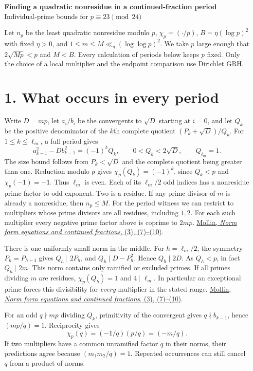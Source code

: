 \documentclass[11pt]{article}
\newcommand{\ch}{\chi_p}
\newcommand{\mollin}{\href{https://www.maths.tcd.ie/EMIS/journals/AMUC/_vol-74/_no_2/_mollin/mollinrea.pdf}{Mollin, \emph{Norm form equations and continued fractions}, (3), (7)--(10)}}
\begin{document}
{\Large\bfseries Finding a quadratic nonresidue in a continued-fraction period}\\[3pt]
{\large Individual-prime bounds for \(p\equiv23\pmod{24}\)}

Let \(n_p\) be the least quadratic nonresidue modulo \(p\), \(\ch=(\cdot/p)\),
\(B=\eta(\log p)^2\) with fixed \(\eta>0\), and \(1\le m\le M\ll_\eta(\log\log p)^2\).
We take \(p\) large enough that \(2\sqrt{Mp}<p\) and \(M<B\). Every calculation
of periods below keeps \(p\) fixed. Only the choice of a local multiplier and the
endpoint comparison use Dirichlet GRH.

\section*{1. What occurs in every period}
Write \(D=mp\), let \(a_i/b_i\) be the convergents to \(\sqrt D\) starting at
\(i=0\), and let \(Q_k\) be the positive denominator of the \(k\)th complete
quotient \((P_k+\sqrt D)/Q_k\). For \(1\le k\le\ell_m\), a full period gives
\begin{equation}
 a_{k-1}^2-Db_{k-1}^2=(-1)^k Q_k,\qquad
 0<Q_k<2\sqrt D,\qquad Q_{\ell_m}=1.
\end{equation}
The size bound follows from \(P_k<\sqrt D\) and the complete quotient being
greater than one. Reduction modulo \(p\) gives
\(\ch(Q_k)=(-1)^k\), since \(Q_k<p\) and \(\ch(-1)=-1\). Thus \(\ell_m\)
is even. Each of its \(\ell_m/2\) odd indices has a nonresidue prime factor
to odd exponent. Two is a residue. If any prime divisor of \(m\) is already a
nonresidue, then \(n_p\le M\). For the period witness we can restrict to
multipliers whose prime divisors are all residues, including \(1,2\).
For each such multiplier every negative prime factor above is coprime to \(2mp\).
\mollin.

There is one uniformly small norm in the middle. For \(h=\ell_m/2\),
the symmetry \(P_h=P_{h+1}\) gives \(Q_h\mid2P_h\), and
\(Q_h\mid D-P_h^2\). Hence \(Q_h\mid2D\). As \(Q_h<p\), in fact \(Q_h\mid2m\).
This norm contains only ramified or excluded primes. If all primes dividing
\(m\) are residues, \(\ch(Q_h)=1\) and \(4\mid\ell_m\).
In particular an exceptional prime forces this divisibility for \emph{every}
multiplier in the stated range. \mollin.

For an odd \(q\nmid mp\) dividing \(Q_k\), primitivity of the convergent
gives \(q\nmid b_{k-1}\), hence \((mp/q)=1\). Reciprocity gives
\begin{equation}
 \ch(q)=(-1/q)(p/q)=(-m/q).
\end{equation}
If two multipliers have a common unramified factor \(q\) in their norms, their
predictions agree because \((m_1m_2/q)=1\). Repeated occurrences can still
cancel \(q\) from a product of norms.
\end{document}
